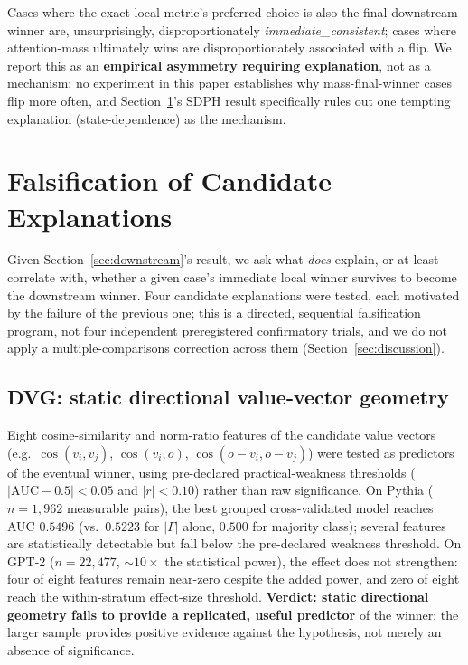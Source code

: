 \documentclass[11pt]{article}
\begin{document}
Cases where the exact local metric's preferred choice is also the final
downstream winner are, unsurprisingly, disproportionately
\emph{immediate\_consistent}; cases where attention-mass ultimately wins are
disproportionately associated with a flip. We report this as an
\textbf{empirical asymmetry requiring explanation}, not as a mechanism; no
experiment in this paper establishes why mass-final-winner cases flip more
often, and Section~\ref{sec:falsification}'s SDPH result specifically rules
out one tempting explanation (state-dependence) as the mechanism.

\section{Falsification of Candidate Explanations}
\label{sec:falsification}

Given Section~\ref{sec:downstream}'s result, we ask what \emph{does}
explain, or at least correlate with, whether a given case's immediate local
winner survives to become the downstream winner. Four candidate
explanations were tested, each motivated by the failure of the previous one;
this is a directed, sequential falsification program, not four independent
preregistered confirmatory trials, and we do not apply a multiple-comparisons
correction across them (Section~\ref{sec:discussion}).

\subsection{DVG: static directional value-vector geometry}

Eight cosine-similarity and norm-ratio features of the candidate value
vectors (e.g.\ $\cos(v_i,v_j)$, $\cos(v_i,o)$, $\cos(o-v_i,o-v_j)$) were
tested as predictors of the eventual winner, using pre-declared practical-weakness
thresholds ($|\text{AUC}-0.5|<0.05$ and $|r|<0.10$) rather than raw
significance. On Pythia ($n=1{,}962$ measurable pairs), the best grouped
cross-validated model reaches AUC $0.5496$ (vs.\ $0.5223$ for $|\Gamma|$
alone, $0.500$ for majority class); several features are statistically
detectable but fall below the pre-declared weakness threshold. On GPT-2
($n=22{,}477$, $\sim\!10\times$ the statistical power), the effect does not
strengthen: four of eight features remain near-zero despite the added power,
and zero of eight reach the within-stratum effect-size threshold. \textbf{Verdict:
static directional geometry fails to provide a replicated, useful predictor}
of the winner; the larger sample provides positive evidence against the
hypothesis, not merely an absence of significance.
\end{document}
